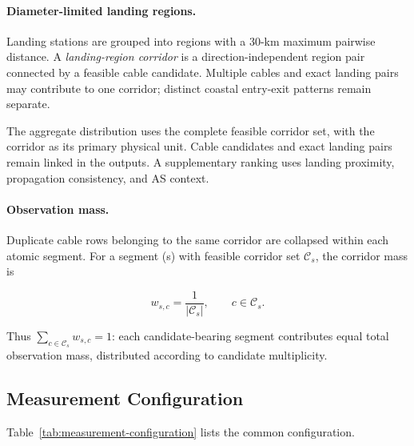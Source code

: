 \paragraph{Diameter-limited landing regions.}
Landing stations are grouped into regions with a 30-km maximum pairwise
distance. A \emph{landing-region corridor} is a direction-independent region
pair connected by a feasible cable candidate. Multiple cables and exact landing
pairs may contribute to one corridor; distinct coastal entry-exit patterns
remain separate.

The aggregate distribution uses the complete feasible corridor set, with the
corridor as its primary physical unit. Cable candidates and exact landing
pairs remain linked in the outputs. A supplementary ranking uses landing
proximity, propagation consistency, and AS context.

\paragraph{Observation mass.}
Duplicate cable rows belonging to the same corridor are collapsed within each
atomic segment. For a segment (s) with feasible corridor set
\(\mathcal{C}_s\), the corridor mass is

\begin{equation}
    w_{s,c}=\frac{1}{|\mathcal{C}_s|},
    \qquad c\in\mathcal{C}_s.
    \label{eq:uniform-mass}
\end{equation}

Thus \(\sum_{c\in\mathcal{C}_s} w_{s,c}=1\): each candidate-bearing segment
contributes equal total observation mass, distributed according to candidate
multiplicity.

\subsection{Measurement Configuration}
\label{sec:framework_configuration}

Table~\ref{tab:measurement-configuration} lists the common configuration.

